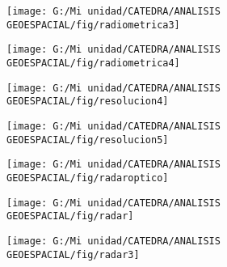 \documentclass[14pt]{beamer}
\begin{document}
\begin{frame}
 \begin{figure}
    \centering
    \texttt{[image: G:/Mi unidad/CATEDRA/ANALISIS GEOESPACIAL/fig/radiometrica3]}
  \end{figure}
\end{frame}
\begin{frame}
 \begin{figure}
    \centering
    \texttt{[image: G:/Mi unidad/CATEDRA/ANALISIS GEOESPACIAL/fig/radiometrica4]}
  \end{figure}
\end{frame}
\begin{frame}
 \begin{figure}
    \centering
    \texttt{[image: G:/Mi unidad/CATEDRA/ANALISIS GEOESPACIAL/fig/resolucion4]}
  \end{figure}
\end{frame}
\begin{frame}
 \begin{figure}
    \centering
    \texttt{[image: G:/Mi unidad/CATEDRA/ANALISIS GEOESPACIAL/fig/resolucion5]}
  \end{figure}
\end{frame}
\begin{frame}
 \begin{figure}
    \centering
    \texttt{[image: G:/Mi unidad/CATEDRA/ANALISIS GEOESPACIAL/fig/radaroptico]}
  \end{figure}
\end{frame}
\begin{frame}
 \begin{figure}
    \centering
    \texttt{[image: G:/Mi unidad/CATEDRA/ANALISIS GEOESPACIAL/fig/radar]}
  \end{figure}
\end{frame}
\begin{frame}
 \begin{figure}
    \centering
    \texttt{[image: G:/Mi unidad/CATEDRA/ANALISIS GEOESPACIAL/fig/radar3]}
  \end{figure}
\end{frame}
\end{document}
